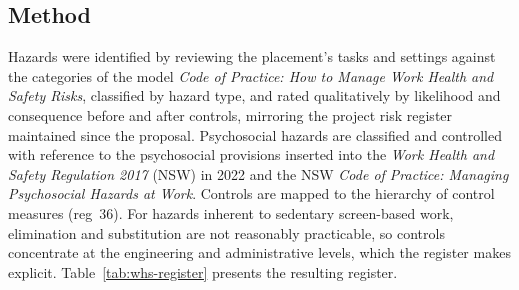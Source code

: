 \subsection{Method}
Hazards were identified by reviewing the placement's tasks and settings
against the categories of the model \textit{Code of Practice: How to Manage
Work Health and Safety Risks}, classified by hazard type, and rated
qualitatively by likelihood and consequence before and after controls,
mirroring the project risk register maintained since the proposal.
Psychosocial hazards are classified and controlled with reference to the
psychosocial provisions inserted into the \textit{Work Health and Safety
Regulation 2017} (NSW) in 2022 and the NSW \textit{Code of Practice:
Managing Psychosocial Hazards at Work}. Controls are mapped to the
hierarchy of control measures (reg~36). For hazards inherent to sedentary
screen-based work, elimination and substitution are not reasonably
practicable, so controls concentrate at the engineering and administrative
levels, which the register makes explicit. Table~\ref{tab:whs-register}
presents the resulting register.

